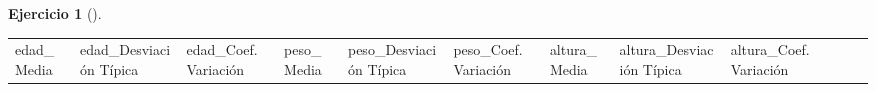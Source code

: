 \documentclass[
  spanish,
  a4paper,
]{scrreport}
\theoremstyle{definition}
\newtheorem{exercise}{Ejercicio}[chapter]
\theoremstyle{remark}
\begin{document}
\begin{exercise}[]
\begin{enumerate}
\begin{tcolorbox}
  \begin{longtable}[]{@{}
    >{\raggedleft\arraybackslash}p{}
    >{\raggedleft\arraybackslash}p{}
    >{\raggedleft\arraybackslash}p{}
    >{\raggedleft\arraybackslash}p{}
    >{\raggedleft\arraybackslash}p{}
    >{\raggedleft\arraybackslash}p{}
    >{\raggedleft\arraybackslash}p{}
    >{\raggedleft\arraybackslash}p{}
    >{\raggedleft\arraybackslash}p{}
    >{\raggedleft\arraybackslash}p{}
    >{\raggedleft\arraybackslash}p{}
    >{\raggedleft\arraybackslash}p{}@{}}
  \toprule\noalign{}
  \begin{minipage}[b]{\linewidth}\raggedleft
  edad\_Media
  \end{minipage} & \begin{minipage}[b]{\linewidth}\raggedleft
  edad\_Desviación Típica
  \end{minipage} & \begin{minipage}[b]{\linewidth}\raggedleft
  edad\_Coef. Variación
  \end{minipage} & \begin{minipage}[b]{\linewidth}\raggedleft
  peso\_Media
  \end{minipage} & \begin{minipage}[b]{\linewidth}\raggedleft
  peso\_Desviación Típica
  \end{minipage} & \begin{minipage}[b]{\linewidth}\raggedleft
  peso\_Coef. Variación
  \end{minipage} & \begin{minipage}[b]{\linewidth}\raggedleft
  altura\_Media
  \end{minipage} & \begin{minipage}[b]{\linewidth}\raggedleft
  altura\_Desviación Típica
  \end{minipage} & \begin{minipage}[b]{\linewidth}\raggedleft
  altura\_Coef. Variación
  \end{minipage} & \begin{minipage}[b]{\linewidth}\raggedleft

\end{minipage}
\end{longtable}
\end{tcolorbox}
\end{enumerate}
\end{exercise}
\end{document}
